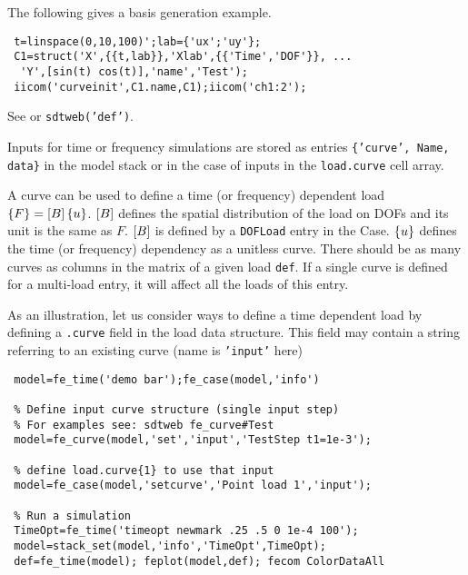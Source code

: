 The following gives a basis generation example. 

\begin{verbatim}
 t=linspace(0,10,100)';lab={'ux';'uy'};
 C1=struct('X',{{t,lab}},'Xlab',{{'Time','DOF'}}, ...
  'Y',[sin(t) cos(t)],'name','Test');
 iicom('curveinit',C1.name,C1);iicom('ch1:2');
\end{verbatim}%


See  or {\tt sdtweb('def')}. 


Inputs for time or frequency simulations are stored as entries {\tt \{'curve', Name, data\}} in the model stack or in the case of inputs in the {\tt load.curve} cell array. 

A curve can be used to define a time (or frequency) dependent load $\left\{F\right\}=\left[B\right]\left\{u\right\}$. $\left[B\right]$ defines the spatial distribution of the load on DOFs and its unit is the same as $F$. $\left[B\right]$ is defined by a {\tt DOFLoad} entry in the Case. $\left\{u\right\}$ defines the time (or frequency) dependency as a unitless curve. There should be as many curves as columns in the matrix of a given load {\tt def}. If a single curve is defined for a multi-load entry, it will affect all the loads of this entry.

As an illustration, let us consider ways to define a time dependent load by defining a {\tt .curve} field in the load data structure. This field may contain a string referring to an existing curve (name is {\tt 'input'} here)

\begin{verbatim}
 model=fe_time('demo bar');fe_case(model,'info')

 % Define input curve structure (single input step) 
 % For examples see: sdtweb fe_curve#Test 
 model=fe_curve(model,'set','input','TestStep t1=1e-3');

 % define load.curve{1} to use that input
 model=fe_case(model,'setcurve','Point load 1','input');

 % Run a simulation
 TimeOpt=fe_time('timeopt newmark .25 .5 0 1e-4 100');
 model=stack_set(model,'info','TimeOpt',TimeOpt);
 def=fe_time(model); feplot(model,def); fecom ColorDataAll
\end{verbatim}%

